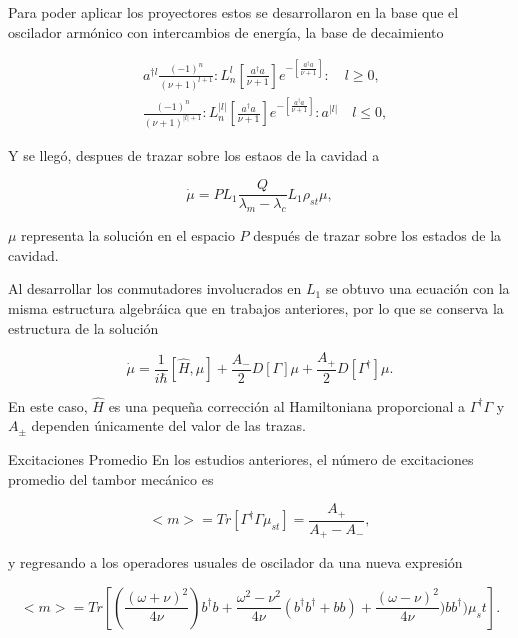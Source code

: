 \documentclass[10pt]{beamer}
\begin{document}
\begin{frame}
Para poder aplicar los proyectores estos se desarrollaron en la base que el oscilador armónico con intercambios de energía, la base de decaimiento

\begin{align*}
&a^{\dagger l}\frac{(-1)^n}{(\nu+1)^{l+1}}:L_n^l[\frac{a^\dagger a}{\nu+1}]e^{-[\frac{a^\dagger a}{\nu+1}]}:\quad l \geq 0, \\
&\frac{(-1)^n}{(\nu+1)^{|l|+1}}:L_n^{|l|}[\frac{a^\dagger a}{\nu+1}]e^{-[\frac{a^\dagger a}{\nu+1}]}:a^{|l|}\quad l \leq 0,
\end{align*}
\end{frame}

\begin{frame}
Y se llegó, despues de trazar sobre los estaos de la cavidad a

\begin{equation}
\dot{\mu} = PL_1 \frac{Q}{\lambda_m-\lambda_c}L_1\rho_{st}\mu,
\end{equation}

$\mu$ representa la solución en el espacio $P$ después de trazar sobre los estados de la cavidad. 
\end{frame}

\begin{frame}

Al desarrollar los conmutadores involucrados en $L_1$ se obtuvo una ecuación con la misma estructura algebráica que en trabajos anteriores, por lo que se conserva la estructura de la solución

\begin{equation*}
\dot{\mu} = \frac{1}{i\hbar}[\hat{H},\mu] + \frac{A_-}{2}D[\Gamma]\mu + \frac{A_+}{2}D[\Gamma^\dagger]\mu.
\end{equation*}

En este caso, $\hat{H}$ es una pequeña corrección al Hamiltoniana proporcional a $\Gamma^\dagger \Gamma$ y $A_\pm$ dependen únicamente del valor de las trazas.

\end{frame}

\begin{frame}{Excitaciones Promedio}
En los estudios anteriores, el número de excitaciones promedio del tambor mecánico es

\begin{equation*}
<m> = Tr[\Gamma^\dagger \Gamma \mu_{st}] = \frac{A_+}{A_+ - A_-},
\end{equation*}

y regresando a los operadores usuales de oscilador da una nueva expresión

\begin{equation*}
<m> = Tr[(\frac{(\omega + \nu )^2}{4\nu})b^\dagger b +\frac{\omega^2 - \nu^2}{4\nu}(b^\dagger b^\dagger +bb) +\frac{(\omega - \nu )^2}{4\nu}) b b^\dagger)\mu_st].
\end{equation*}

\end{frame}
\end{document}
